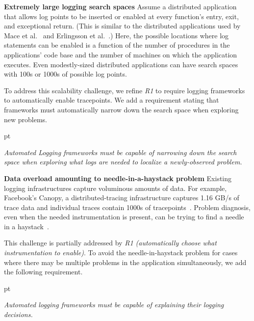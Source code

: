   \noindent\textbf{Extremely large logging search spaces} Assume a
distributed application that allows log points to be inserted or
enabled at every function's entry, exit, and exceptional return. (This
is similar to the distributed applications used by Mace et
al.~\cite{Mace:2015uh} and Erlingsson et
al.~\cite{Erlingsson:2011wy}.)  Here, the possible locations where log
statements can be enabled is a function of the number of procedures in
the applications' code base and the number of machines on which the
application executes.  Even modestly-sized distributed applications
can have search spaces with 100s or 1000s of possible log points.

To address this scalability challenge, we refine \textit{R1} to
require logging frameworks to automatically enable tracepoints.  We
add a requirement stating that frameworks must
automatically narrow down the search space when exploring new
problems.

\begin{description}%
     pt
  \item[\textit{R2}] \textit{Automated Logging frameworks must 
    be capable of narrowing down the search space when exploring what
    logs are needed to localize a newly-observed problem.} 
  \end{description}


  \noindent\textbf{Data overload amounting to needle-in-a-haystack problem}
Existing logging infrastructures capture voluminous amounts of data.
For example, Facebook's Canopy, a distributed-tracing infrastructure
captures 1.16 GB/s of trace data and individual traces contain
1000s of tracepoints~\cite{Kaldor:2017gp}.  Problem diagnosis, even
when the needed instrumentation is present, can be trying to
find a needle in a haystack~\cite{Rabkin:2013wy}.

This challenge is partially addressed by \textit{R1 (automatically
  choose what instrumentation to enable)}.  To avoid the needle-in-haystack
problem for cases where there may be multiple problems in the
application simultaneously, we add the following requirement.

\begin{description}%
   pt \item[\textit{R3}] \textit{Automated logging
  frameworks must be capable of explaining their logging decisions.}

\end{description}



